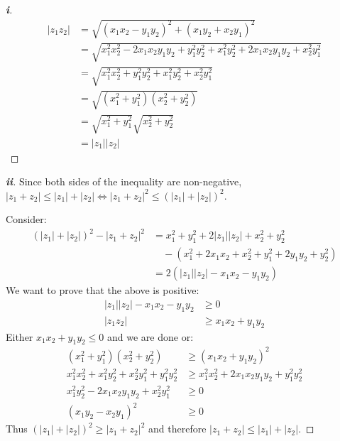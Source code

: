 \documentclass[../main.tex]{subfiles}
\begin{document}
\begin{proof}[\textbf{i}]
  \begin{align*}
      |z_1 z_2| &= \sqrt{(x_1 x_2 - y_1 y_2)^2 + (x_1 y_2 + x_2 y_1)^2}\\
                &= \sqrt{x^{2}_{1} x^{2}_{2} -2x_1x_2y_1y_2 + y^{2}_{1}y^{2}_{2} + x^{2}_{1}y^{2}_{2} + 2x_1x_2y_1y_2 + x^{2}_{2}y^{2}_{1}} \\
                &= \sqrt{x^{2}_{1} x^{2}_{2} + y^{2}_{1} y^{2}_{2} + x^{2}_{1} y^{2}_{2} + x^{2}_{2} y^{2}_{1}} \\
                &= \sqrt{\left(x^{2}_{1} + y^{2}_{1}\right)\left(x^{2}_{2} + y^{2}_{2}\right)} \\
                &= \sqrt{x^{2}_{1} + y^{2}_{1}}\sqrt{x^{2}_{2} + y^{2}_{2}} \\
                &= |z_1||z_2|
  \end{align*}
\end{proof}
\begin{proof}[\textbf{ii}]
  Since both sides of the inequality are non-negative, $|z_1 + z_2| \leq |z_1| + |z_2| \iff |z_1 + z_2|^2 \leq (|z_1| + |z_2|)^2$.

  Consider:
  \begin{align*}
      (|z_1| + |z_2|)^2 - |z_1 + z_2|^2 &= x^{2}_{1} + y^{2}_{1} + 2|z_1|| z_2| + x^{2}_{2} + y^{2}_{2} \\
                                        & \quad - (x^{2}_{1} + 2x_1x_2 + x^{2}_{2} + y^{2}_{1} + 2y_1y_2 + y^{2}_{2})\\
                                        &= 2(|z_1||z_2| - x_1 x_2 - y_1 y_2)
  \end{align*}
  We want to prove that the above is positive:
  \begin{align*}
    |z_1||z_2| - x_1 x_2 - y_1 y_2 &\geq 0 \\
    |z_1 z_2| &\geq x_1 x_2 + y_1 y_2
  \end{align*}
  Either $x_1 x_2 + y_1 y_2 \leq 0$ and we are done or:
  \begin{align*}
    (x^{2}_{1} + y^{2}_{1})(x^{2}_{2} + y^{2}_{2}) &\geq (x_1 x_2 + y_1 y_2)^2 \\
    x^{2}_{1} x^{2}_{2} + x^{2}_{1} y^{2}_{2} + x^{2}_{2} y^{2}_{1} + y^{2}_{1} y^{2}_{2}&\geq x^{2}_{1} x^{2}_{2} + 2x_1 x_2 y_1 y_2 + y^{2}_{1} y^{2}_{2} \\
    x^{2}_{1} y^{2}_{2} - 2x_1 x_2 y_1 y_2 + x^{2}_{2} y^{2}_{1} &\geq 0 \\
    (x_1 y_2 - x_2 y_1)^2 &\geq 0
  \end{align*}
  Thus $(|z_1| + |z_2|)^2 \geq |z_1 + z_2|^2$ and therefore $|z_1 + z_2| \leq |z_1| + |z_2|$.
\end{proof}
\end{document}
